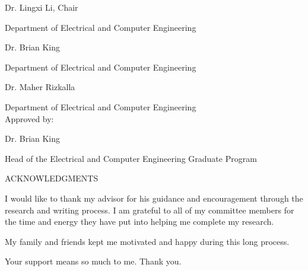 \documentclass[letterpaper,12pt,oneside]{book}
\begin{document}
	Dr. Lingxi Li, Chair
	
	\hspace{1cm} Department of Electrical and Computer Engineering
	
	Dr. Brian King 
	
	\hspace{1cm} Department of Electrical and Computer Engineering		
	
	Dr. Maher Rizkalla 
	
	\hspace{1cm} Department of Electrical and Computer Engineering	\\
	
	Approved by:
	
	Dr. Brian King 
	
	\hspace{1cm} Head of the Electrical and Computer Engineering Graduate Program
	
	\newpage
	\begin{center}
		ACKNOWLEDGMENTS\\[20pt]
	\end{center}
	\begin{flushleft}
	I would like to thank my advisor for his guidance and encouragement through the research and writing process. I am grateful to all of my committee members for the time and energy they have put into helping me complete my research. 
	
	\bigskip
	My family and friends kept me motivated and happy during this long process.
	
	\bigskip
	Your support means so much to me. Thank you.
	\end{flushleft}

		
	\let\origaddvspace\addvspace
	\renewcommand{\addvspace}[1]{}
	\setcounter{tocdepth}{3} %
	\renewcommand\contentsname{TABLE OF CONTENTS}
	\tableofcontents
	\renewcommand\listfigurename{LIST OF FIGURES}
	\listoffigures
	\renewcommand\listtablename{LIST OF TABLES}
	\listoftables
	\renewcommand{\addvspace}[1]{\origaddvspace{#1}}
		
		
\end{document}
